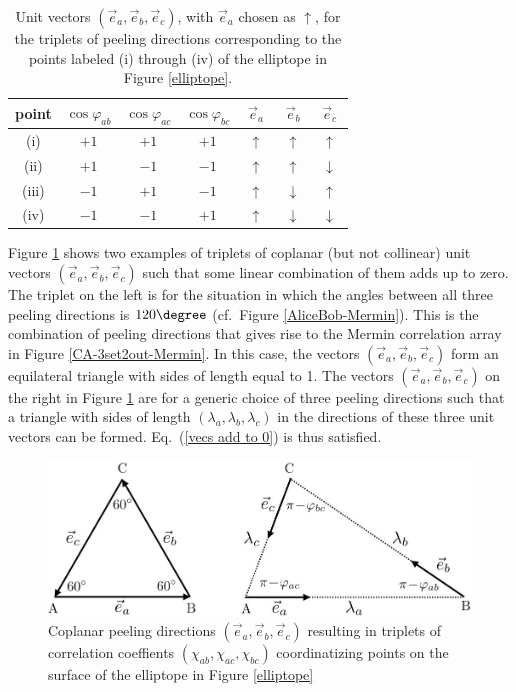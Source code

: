 \begin{table}[ht]
\centering
\begin{tabular}{|c||c|c|c||c|c|c|}
\hline
$\!$point$\!$ & $\cos{\varphi_{ab}} $ & $\cos{\varphi_{ac}} $ & $\cos{\varphi_{bc}} $ & $\; \vec{e}_a \;$ & $\; \vec{e}_b \;$ & $\; \vec{e}_c \;$ \\[.1cm] 
\hline
 (i) & $+1$ & $+1$ & $+1$ & $\uparrow$ & $\uparrow$ & $\uparrow$ \\[.2cm]
 (ii) & $+1$ & $-1$ & $-1$ & $\uparrow$ & $\uparrow$ & $\downarrow$ \\[.2cm]
 (iii) & $-1$ & $+1$ & $-1$ & $\uparrow$ & $\downarrow$ & $\uparrow$ \\[.2cm]
(iv) & $-1$ & $-1$ & $+1$ & $\uparrow$ & $\downarrow$ & $\downarrow$ \\
 \hline
\end{tabular}
\caption{Unit vectors $(\vec{e}_a, \vec{e}_b, \vec{e}_c)$, with $\vec{e}_a$ chosen as $\uparrow$, for the triplets of peeling directions corresponding to the points labeled (i) through (iv) of the elliptope in Figure \ref{elliptope}.}
\label{collinear peeling directions}
\end{table} 

Figure \ref{vectors4elliptope} shows two examples of triplets of coplanar (but not collinear) unit vectors $(\vec{e}_a, \vec{e}_b, \vec{e}_c)$ such that some linear combination of them adds up to zero. The triplet on the left is for the situation in which the angles between all three peeling directions is $120\degree$ (cf.\ Figure \ref{AliceBob-Mermin}). This is the combination of peeling directions that gives rise to the Mermin correlation array in Figure \ref{CA-3set2out-Mermin}. In this case, the vectors $(\vec{e}_a, \vec{e}_b, \vec{e}_c)$ form an equilateral triangle with sides of length equal to 1. The vectors $(\vec{e}_a, \vec{e}_b, \vec{e}_c)$ on the right in Figure \ref{vectors4elliptope} are for a generic choice of three peeling directions such that a triangle with sides of length $(\lambda_a, \lambda_b, \lambda_c)$ in the directions of these three unit vectors can be formed. Eq.\ (\ref{vecs add to 0}) is thus satisfied. 

\begin{figure}[h!]
 \centering
   \includegraphics[width=4.5in]{vectors4elliptope.jpeg} 
   \caption{Coplanar peeling directions $(\vec{e}_a, \vec{e}_b, \vec{e}_c)$ resulting in triplets of correlation coeffients $(\chi_{ab}, \chi_{ac}, \chi_{bc})$ coordinatizing points on the surface of the elliptope in Figure \ref{elliptope}}
   \label{vectors4elliptope}
\end{figure}

